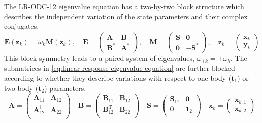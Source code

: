 The LR-ODC-12 eigenvalue equation has a two-by-two block structure which
describes the independent variation of the state parameters and their complex
conjugates.
\begin{equation}
    \label{eq:linear-response-eigenvalue-equation}
    \mathbf{E}(\mathbf{z}_k)
    =
    \omega_k
    \mathbf{M}(\mathbf{z}_k)
    ,
    \quad
    \mathbf{E}
    =
    \begin{pmatrix}
        \mathbf{A} & \mathbf{B} \\
        \mathbf{B}^* & \mathbf{A}^*
    \end{pmatrix}
    ,
    \quad
    \mathbf{M}
    =
    \begin{pmatrix}
        \mathbf{S} & \mathbf{0} \\
        \mathbf{0} & -\mathbf{S}^*
    \end{pmatrix}
    ,
    \quad
    \mathbf{z}_k
    =
    \begin{pmatrix}
        \mathbf{x}_k \\
        \mathbf{y}_k
    \end{pmatrix}
\end{equation}
This block symmetry leads to a paired system of eigenvalues,
\(
    \omega_{\pm k}
    =
    \pm\omega_k
\).
The submatrices in \cref{eq:linear-response-eigenvalue-equation} are further
blocked according to whether they describe variations with respect to one-body
(\(\mathbf{t}_1\)) or two-body (\(\mathbf{t}_2\)) parameters.
\begin{equation}
    \mathbf{A}
    =
    \begin{pmatrix}
        \mathbf{A}_{11} & \mathbf{A}_{12} \\
        \mathbf{A}_{12}^\dagger & \mathbf{A}_{22} \\
    \end{pmatrix}
    \quad
    \mathbf{B}
    =
    \begin{pmatrix}
        \mathbf{B}_{11} & \mathbf{B}_{12} \\
        \mathbf{B}_{12}^\mathrm{T} & \mathbf{B}_{22} \\
    \end{pmatrix}
    \quad
    \mathbf{S}
    =
    \begin{pmatrix}
        \mathbf{S}_{11} & \mathbf{0} \\
        \mathbf{0} & \mathbf{1}_2 \\
    \end{pmatrix}
    \quad
    \mathbf{x}_k
    =
    \begin{pmatrix}
        \mathbf{x}_{k,1} \\
        \mathbf{x}_{k,2}
    \end{pmatrix}
\end{equation}
